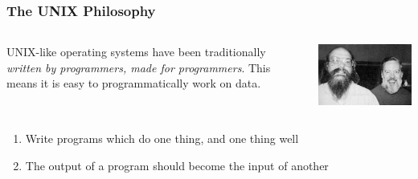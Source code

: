 \documentclass{lug}
\begin{document}
\begin{frame}
    \frametitle{The UNIX Philosophy}

    \begin{columns}
        \begin{column}{0.8\textwidth}
    UNIX-like operating systems have been traditionally \emph{written by
    programmers, made for programmers}. This means it is easy to
    programmatically work on data.
        \end{column}
        \begin{column}{0.2\textwidth}
            \includegraphics[width=\textwidth]{graphics/ken_dmr}
        \end{column}
    \end{columns}

    \bigskip

    \begin{tcolorbox}[size=fbox,sharp corners=all]
        \small
    \begin{enumerate}
        \setlength\itemsep{2pt}
        \item \small Write programs which do one thing, and one thing well
        \item \small The output of a program should become the input of another
    \end{enumerate}
    \end{tcolorbox}

    \bigskip

    {%
        \bfseries
    }

    \medskip

\end{frame}
\end{document}
